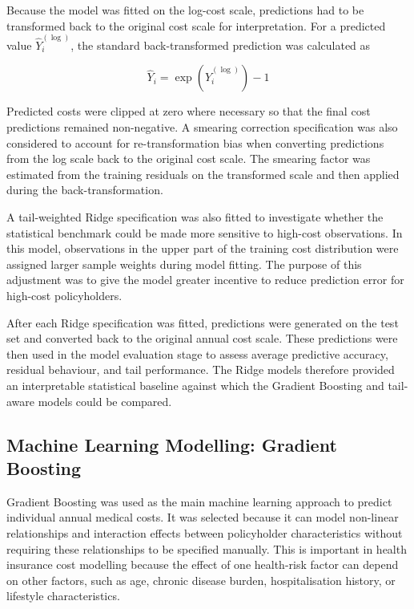 	Because the model was fitted on the log-cost scale, predictions had to be transformed back to the original cost scale for interpretation. For a predicted value \(\hat{Y}_i^{(\log)}\), the standard back-transformed prediction was calculated as
	
	\begin{equation} \label{eq:7}
		\hat{Y}_i = \exp\left(\hat{Y}_i^{(\log)}\right) - 1
	\end{equation}
	
	Predicted costs were clipped at zero where necessary so that the final cost predictions remained non-negative. A smearing correction specification was also considered to account for re-transformation bias when converting predictions from the log scale back to the original cost scale. The smearing factor was estimated from the training residuals on the transformed scale and then applied during the back-transformation.
	
	A tail-weighted Ridge specification was also fitted to investigate whether the statistical benchmark could be made more sensitive to high-cost observations. In this model, observations in the upper part of the training cost distribution were assigned larger sample weights during model fitting. The purpose of this adjustment was to give the model greater incentive to reduce prediction error for high-cost policyholders.
	
	After each Ridge specification was fitted, predictions were generated on the test set and converted back to the original annual cost scale. These predictions were then used in the model evaluation stage to assess average predictive accuracy, residual behaviour, and tail performance. The Ridge models therefore provided an interpretable statistical baseline against which the Gradient Boosting and tail-aware models could be compared.

	\subsection{Machine Learning Modelling: Gradient Boosting}
	
	Gradient Boosting was used as the main machine learning approach to predict individual annual medical costs. It was selected because it can model non-linear relationships and interaction effects between policyholder characteristics without requiring these relationships to be specified manually. This is important in health insurance cost modelling because the effect of one health-risk factor can depend on other factors, such as age, chronic disease burden, hospitalisation history, or lifestyle characteristics.
	
